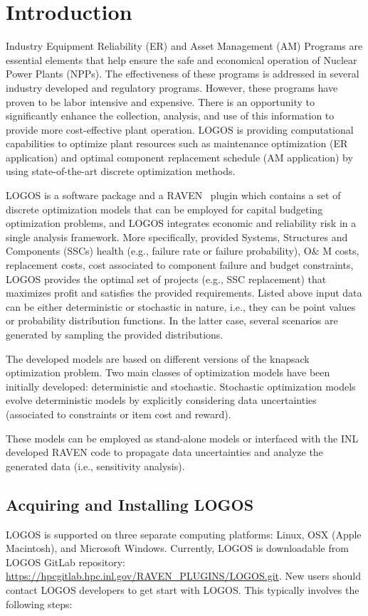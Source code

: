 \section{Introduction}
\label{sec:Introduction}

Industry Equipment Reliability (ER) and Asset Management (AM) Programs are essential elements that
help ensure the safe and economical operation of Nuclear Power Plants (NPPs). The effectiveness of
these programs is addressed in several industry developed and regulatory programs. However, these
programs have proven to be labor intensive and expensive. There is an opportunity to significantly
enhance the collection, analysis, and use of this information to provide more cost-effective plant
operation. LOGOS is providing computational capabilities to optimize plant resources such as
maintenance optimization (ER application) and optimal component replacement schedule (AM application)
by using state-of-the-art discrete optimization methods.

LOGOS is a software package and a RAVEN~\cite{RAVEN,RAVENtheoryMan} plugin which
contains a set of discrete optimization models that can be
employed for capital budgeting optimization problems, and LOGOS integrates economic and reliability
risk in a single analysis framework. More specifically,  provided Systems, Structures and Components
(SSCs) health (e.g., failure rate or failure probability), O\& M costs, replacement costs, cost
associated to component failure and budget constraints, LOGOS provides the optimal set of projects
(e.g., SSC replacement) that maximizes profit and satisfies the provided requirements.
Listed above input data can be either deterministic or stochastic in nature, i.e., they can be point values
or probability distribution functions. In the latter case, several scenarios are generated by
sampling the provided distributions.

The developed models are based on different versions of the knapsack optimization problem.
Two main classes of optimization models have been initially developed: deterministic and stochastic.
Stochastic optimization models evolve deterministic models by explicitly considering data
uncertainties (associated to constraints or item cost and reward).

These models can be employed as stand-alone models or interfaced with the INL developed RAVEN code
to propagate data uncertainties and analyze the generated data (i.e., sensitivity analysis).

\subsection{Acquiring and Installing LOGOS}
LOGOS is supported on three separate computing platforms: Linux, OSX (Apple Macintosh), and Microsoft
Windows. Currently, LOGOS is downloadable from LOGOS GitLab repository:
\url{https://hpcgitlab.hpc.inl.gov/RAVEN_PLUGINS/LOGOS.git}. New users should contact LOGOS developers to
get start with LOGOS. This typically involves the following steps:

